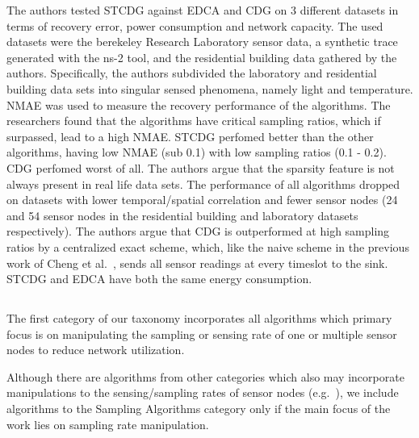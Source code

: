 The authors tested \ac{STCDG} against \ac{EDCA} and \ac{CDG} on 3 different
datasets in terms of recovery error, power consumption and network capacity.
The used datasets were the berekeley Research Laboratory sensor data, a
synthetic trace generated with the ns-2 tool, and the residential building data
gathered by the authors. Specifically, the authors subdivided the laboratory
and residential building data sets into singular sensed phenomena, namely light
and temperature. \ac{NMAE} was used to measure the recovery performance of the
algorithms. The researchers found that the algorithms have critical sampling
ratios, which if surpassed, lead to a high \ac{NMAE}. \ac{STCDG} perfomed
better than the other algorithms, having low \ac{NMAE} (sub 0.1) with low
sampling ratios (0.1 - 0.2). \ac{CDG} perfomed worst of all. The authors argue
that the sparsity feature is not always present in real life data sets. The
performance of all algorithms dropped on datasets with lower temporal/spatial
correlation and fewer sensor nodes (24 and 54 sensor nodes in the residential
building and laboratory datasets respectively). The authors argue that \ac{CDG}
is outperformed at high sampling ratios by a centralized exact scheme, which,
like the naive scheme in the previous work of Cheng et
al.~\cite{cheng2013stcdg}, sends all sensor readings at every timeslot to the
sink. \ac{STCDG} and \ac{EDCA} have both the same energy consumption.


\subsection{\catII} %
\label{sec:catII}

The first category of our taxonomy incorporates all algorithms which primary 
focus is on manipulating the sampling or sensing rate of one or multiple sensor
nodes to reduce network utilization.
 
Although there are algorithms from other categories which also may incorporate
manipulations to the sensing/sampling rates of sensor nodes
(e.g.~\cite{trihinas2015adam}), we include algorithms to the Sampling Algorithms
category only if the main focus of the work lies on sampling rate manipulation. %

